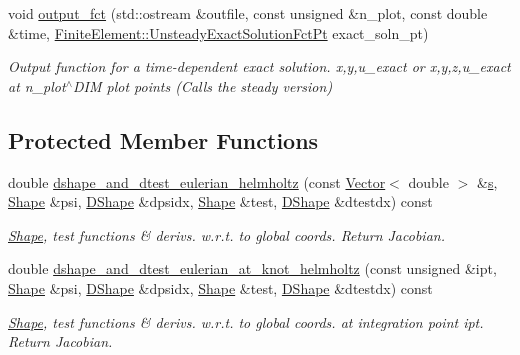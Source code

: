 \begin{DoxyCompactItemize}
void \hyperlink{classoomph_1_1QHelmholtzElement_ad9aeaf3b84064897747f46590f4f87e3}{output\+\_\+fct} (std\+::ostream \&outfile, const unsigned \&n\+\_\+plot, const double \&time, \hyperlink{classoomph_1_1FiniteElement_ad4ecf2b61b158a4b4d351a60d23c633e}{Finite\+Element\+::\+Unsteady\+Exact\+Solution\+Fct\+Pt} exact\+\_\+soln\+\_\+pt)
\begin{DoxyCompactList}\small\item\em Output function for a time-\/dependent exact solution. x,y,u\+\_\+exact or x,y,z,u\+\_\+exact at n\+\_\+plot$^\wedge$\+D\+IM plot points (Calls the steady version) \end{DoxyCompactList}\end{DoxyCompactItemize}
\subsection*{Protected Member Functions}
\begin{DoxyCompactItemize}
\item 
double \hyperlink{classoomph_1_1QHelmholtzElement_af7fc05bfa3f872b6d82596406faf2e26}{dshape\+\_\+and\+\_\+dtest\+\_\+eulerian\+\_\+helmholtz} (const \hyperlink{classoomph_1_1Vector}{Vector}$<$ double $>$ \&\hyperlink{cfortran_8h_ab7123126e4885ef647dd9c6e3807a21c}{s}, \hyperlink{classoomph_1_1Shape}{Shape} \&psi, \hyperlink{classoomph_1_1DShape}{D\+Shape} \&dpsidx, \hyperlink{classoomph_1_1Shape}{Shape} \&test, \hyperlink{classoomph_1_1DShape}{D\+Shape} \&dtestdx) const
\begin{DoxyCompactList}\small\item\em \hyperlink{classoomph_1_1Shape}{Shape}, test functions \& derivs. w.\+r.\+t. to global coords. Return Jacobian. \end{DoxyCompactList}\item 
double \hyperlink{classoomph_1_1QHelmholtzElement_ade0cbf9a26ee1ac1f64fd999d8903a72}{dshape\+\_\+and\+\_\+dtest\+\_\+eulerian\+\_\+at\+\_\+knot\+\_\+helmholtz} (const unsigned \&ipt, \hyperlink{classoomph_1_1Shape}{Shape} \&psi, \hyperlink{classoomph_1_1DShape}{D\+Shape} \&dpsidx, \hyperlink{classoomph_1_1Shape}{Shape} \&test, \hyperlink{classoomph_1_1DShape}{D\+Shape} \&dtestdx) const
\begin{DoxyCompactList}\small\item\em \hyperlink{classoomph_1_1Shape}{Shape}, test functions \& derivs. w.\+r.\+t. to global coords. at integration point ipt. Return Jacobian. \end{DoxyCompactList}\end{DoxyCompactItemize}
